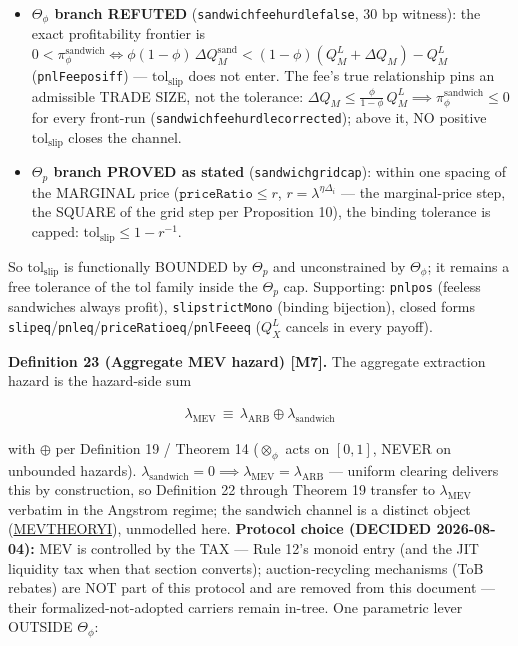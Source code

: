 \documentclass[11pt]{article}
\providecommand{\tightlist}{\setlength{\itemsep}{0pt}\setlength{\parskip}{0pt}}
\renewcommand{\_}{\textunderscore\allowbreak}
\begin{document}
\begin{itemize}
\tightlist
\item
  \textbf{\(\Theta_{\phi}\) branch REFUTED} (\texttt{sandwich\_fee\_hurdle\_false}, 30 bp witness): the exact profitability frontier is \(0 < \pi^{\text{sandwich}}_{\phi} \iff \phi(1-\phi)\,\Delta Q_M^{\text{sand}} < (1-\phi)(Q_M^L+\Delta Q_M) - Q_M^L\) (\texttt{pnlFee\_pos\_iff}) --- \(\mathrm{tol}_{\text{slip}}\) does not enter. The fee's true relationship pins an admissible TRADE SIZE, not the tolerance: \(\Delta Q_M \leq \tfrac{\phi}{1-\phi}\,Q_M^L \implies \pi^{\text{sandwich}}_{\phi} \leq 0\) for every front-run (\texttt{sandwich\_fee\_hurdle\_corrected}); above it, NO positive \(\mathrm{tol}_{\text{slip}}\) closes the channel.
\item
  \textbf{\(\Theta_p\) branch PROVED as stated} (\texttt{sandwich\_grid\_cap}): within one spacing of the MARGINAL price (\(\texttt{priceRatio} \leq r\), \(r = \lambda^{\eta\Delta_i}\) --- the marginal-price step, the SQUARE of the grid step per Proposition 10), the binding tolerance is capped: \(\mathrm{tol}_{\text{slip}} \leq 1 - r^{-1}\).
\end{itemize}

So \(\mathrm{tol}_{\text{slip}}\) is functionally BOUNDED by \(\Theta_p\) and unconstrained by \(\Theta_{\phi}\); it remains a free tolerance of the \(\mathrm{tol}\) family inside the \(\Theta_p\) cap. Supporting: \texttt{pnl\_pos} (feeless sandwiches always profit), \texttt{slip\_strictMono} (binding bijection), closed forms \texttt{slip\_eq}/\allowbreak\texttt{pnl\_eq}/\allowbreak\texttt{priceRatio\_eq}/\allowbreak\texttt{pnlFee\_eq} (\(Q_X^L\) cancels in every payoff).

\textbf{Definition 23 (Aggregate MEV hazard) {[}M7{]}.} The aggregate extraction hazard is the hazard-side sum

\[
    \begin{aligned}
        \lambda_{\text{MEV}} \, \equiv \, \lambda_{\text{ARB}} \oplus \lambda_{\text{sandwich}}
    \end{aligned}
\]

with \(\oplus\) per Definition 19 / Theorem 14 (\(\otimes_{\phi}\) acts on \([0,1]\), NEVER on unbounded hazards). \(\lambda_{\text{sandwich}} = 0 \implies \lambda_{\text{MEV}} = \lambda_{\text{ARB}}\) --- uniform clearing delivers this by construction, so Definition 22 through Theorem 19 transfer to \(\lambda_{\text{MEV}}\) verbatim in the Angstrom regime; the sandwich channel is a distinct object (\href{../refs/mev/KulkarniDiamandisChitraTheoryMEV1.pdf}{MEV\_THEORY\_I}), unmodelled here. \textbf{Protocol choice (DECIDED 2026-08-04):} MEV is controlled by the TAX --- Rule 12's monoid entry (and the JIT liquidity tax when that section converts); auction-recycling mechanisms (ToB rebates) are NOT part of this protocol and are removed from this document --- their formalized-not-adopted carriers remain in-tree. One parametric lever OUTSIDE \(\Theta_{\phi}\):
\end{document}

